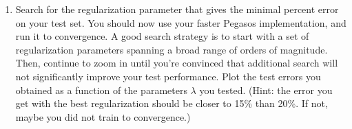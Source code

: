\documentclass{article}
\theoremstyle{plain}
\theoremstyle{definition}
\begin{document}
\begin{enumerate}
\item Search for the regularization parameter that gives the minimal percent error
on your test set. You should now use your faster Pegasos implementation,
and run it to convergence. A good search strategy is to start with
a set of regularization parameters spanning a broad range of orders
of magnitude. Then, continue to zoom in until you're convinced that
additional search will not significantly improve your test performance.
Plot the test errors you obtained as a function of the parameters $\lambda$ you tested. (Hint: the error you get with the best regularization should be closer to 15\% than 20\%. If not, maybe you did not train to convergence.)\\

\begin{itemize}
    \color{blue}
    \begin{itemize}
    \color{blue}
      \inputminted[firstline=235, lastline=245, breaklines=True]{python}{hw_3.py}
\end{itemize}


\end{itemize}
\end{enumerate}
\end{document}

